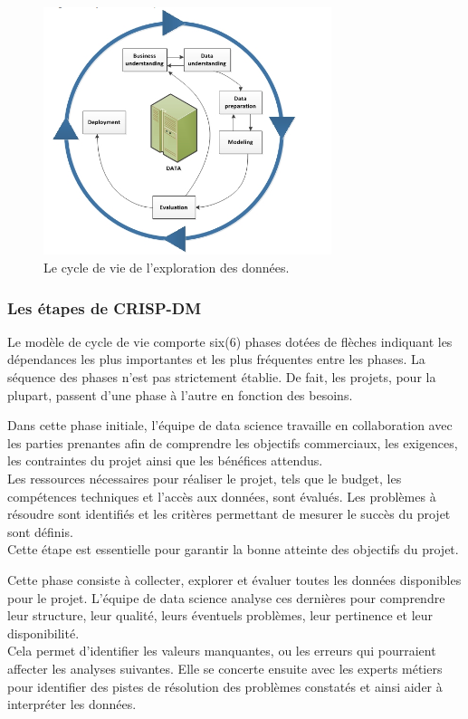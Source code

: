 \documentclass[a4paper,12pt]{article}
\begin{document}
        \begin{figure}[htbp]
                \centering
                \includegraphics[width=0.75\textwidth]{crispdm}
                \caption{Le cycle de vie de l'exploration des données.}
                \label{fig:mesh1}
        \end{figure} 

        \subsubsection{Les étapes de CRISP-DM}
        Le modèle de cycle de vie comporte six(6) phases dotées de flèches indiquant les dépendances les plus importantes et les plus fréquentes entre les phases. La séquence des phases n'est pas strictement établie. De fait, les projets, pour la plupart, passent d'une phase à l'autre en fonction des besoins. 

            Dans cette phase initiale, l’équipe de data science travaille en collaboration avec les parties prenantes afin de comprendre les objectifs commerciaux, les exigences, les contraintes du projet ainsi que les bénéfices attendus.\\ 
            Les ressources nécessaires pour réaliser le projet, tels que le budget, les compétences techniques et l'accès aux données, sont évalués. Les problèmes à résoudre sont identifiés et les critères permettant de mesurer le succès du projet sont définis. \\
            Cette étape est essentielle pour garantir la bonne atteinte des objectifs du projet.
    
            Cette phase consiste à collecter, explorer et évaluer toutes les données disponibles pour le projet. L'équipe de data science analyse ces dernières pour comprendre leur structure, leur qualité, leurs éventuels problèmes, leur pertinence et leur disponibilité. \\
            Cela permet d’identifier les valeurs manquantes, ou les erreurs qui pourraient affecter les analyses suivantes. Elle se concerte ensuite avec les experts métiers pour identifier des pistes de résolution des problèmes constatés et ainsi aider à interpréter les données.
    
\end{document}
